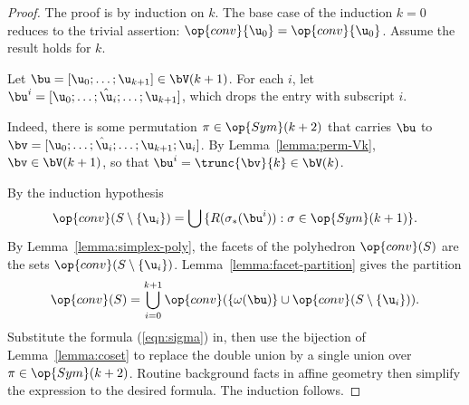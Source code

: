 \begin{proof} The proof is by induction on $k$.  The base case of the induction $k=0$
reduces to the trivial assertion: $\op{conv}\{\u_0\} = \op{conv}\{\u_0\}$.  Assume
the result holds for $k$.

Let $\bu=[\u_0;\ldots;\u_{k+1}]\in \bV(k+1)$.  For each $i$,  let
$\bu^i = [\u_0;\ldots;\hat\u_i;\ldots;\u_{k+1}]$, which drops the entry with subscript $i$.

  Indeed, there is some permutation
$\pi\in \op{Sym}(k+2)$ that carries $\bu$ to
$\bv=[\u_0;\ldots;\hat\u_i;\ldots;\u_{k+1};\u_i]$.  By
Lemma~\ref{lemma:perm-Vk}, $\bv\in \bV(k+1)$, so that $\bu^i =
\trunc{\bv}{k}\in \bV(k)$.

By the induction hypothesis 
\begin{equation}\label{eqn:sigma} 
\op{conv}(S\setminus\{\u_i\}) = \bigcup \,\{ R(\sigma_*(\bu^i)) : \sigma\in \op{Sym}(k+1)\}.
\end{equation}
By Lemma~\ref{lemma:simplex-poly}, the facets of the polyhedron
$\op{conv}(S)$ are the sets $\op{conv}(S\setminus\{\u_i\})$.
Lemma~\ref{lemma:facet-partition} gives the partition
\begin{displaymath} 
\op{conv}(S) = \bigcup_{i=0}^{k+1} \op{conv}(\{\omega(\bu)\}\cup \op{conv}(S\setminus\{\u_i\})).
\end{displaymath}
Substitute the formula (\ref{eqn:sigma}) in, then use the bijection of Lemma~\ref{lemma:coset} to replace the double union by a single union over $\pi\in \op{Sym}(k+2)$.  Routine background
facts in affine geometry then simplify the expression to the desired formula.
The induction follows.
%
%
%
\end{proof}



